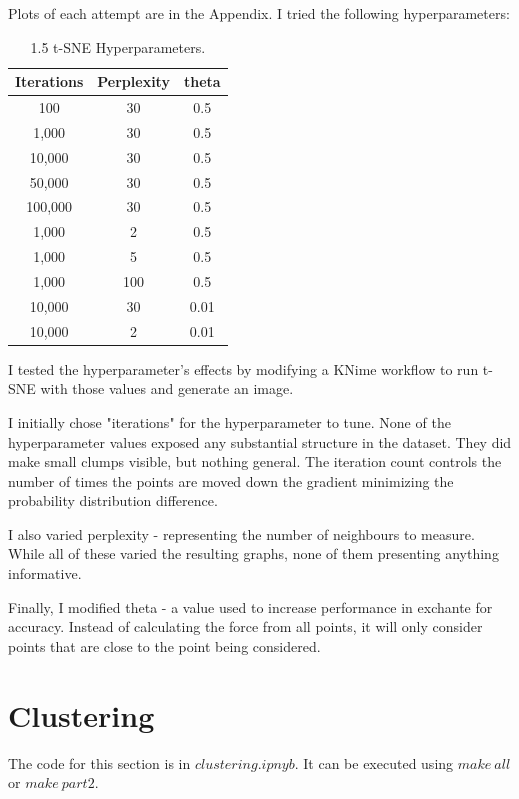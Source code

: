 \documentclass[11pt]{article}
\begin{document}
Plots of each attempt are in the Appendix. I tried the following hyperparameters:

\begin{table}[H]
	\centering
\begin{tabular}{ | c | c | c | }
	\hline
	\textbf{Iterations} & \textbf{Perplexity} & \textbf{theta} \\
	\hline
	100 & 30 & 0.5  \\
	\hline	
	1,000 & 30 & 0.5  \\
	\hline
	10,000 & 30 & 0.5 \\
	\hline
	50,000 & 30 & 0.5 \\
	\hline
	100,000 & 30 & 0.5 \\
	\hline
	1,000 & 2 & 0.5	\\	
	\hline
	1,000 & 5 & 0.5 \\
	\hline
	1,000 & 100 & 0.5 \\
	\hline
	10,000 & 30 & 0.01 \\
	\hline
	10,000 & 2 & 0.01 \\			
	\hline
\end{tabular}
\caption{1.5 t-SNE Hyperparameters.}
\end{table}

I tested the hyperparameter's effects by modifying a KNime workflow to run t-SNE with those values and generate an image.

I initially chose "iterations" for the hyperparameter to tune. None of the hyperparameter values exposed any substantial structure in the dataset. They did make small clumps visible, but nothing general. The iteration count controls the number of times the points are moved down the gradient minimizing the probability distribution difference.

I also varied perplexity - representing the number of neighbours to measure. While all of these varied the resulting graphs, none of them presenting anything informative.

Finally, I modified theta - a value used to increase performance in exchante for accuracy. Instead of calculating the force from all points, it will only consider points that are close to the point being considered.

\section{Clustering}

The code for this section is in \(clustering.ipnyb\). It can be executed using \(make\ all\) or \(make\ part2\).
\end{document}
